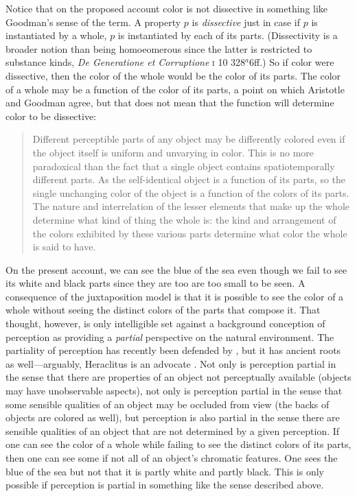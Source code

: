 Notice that on the proposed account color is not dissective in something like Goodman's \citeyearpar[53]{Goodman:1951ww} sense of the term. A property \( p \) is \emph{dissective} just in case if \( p \) is instantiated by a whole, \( p \) is instantiated by each of its parts. (Dissectivity is a broader notion than being homoeomerous since the latter is restricted to substance kinds, \emph{De Generatione et Corruptione} \textsc{i} 10 328\( ^{a} \)6ff.) So if color were dissective, then the color of the whole would be the color of its parts. The color of a whole may be a function of the color of its parts, a point on which Aristotle and Goodman agree, but that does not mean that the function will determine color to be dissective:
\begin{quote}
	Different perceptible parts of any object may be differently colored even if the object itself is uniform and unvarying in color. This is no more paradoxical than the fact that a single object contains spatiotemporally different parts. As the self-identical object is a function of its parts, so the single unchanging color of the object is a function of the colors of its parts. The nature and interrelation of the lesser elements that make up the whole determine what kind of thing the whole is: the kind and arrangement of the colors exhibited by these various parts determine what color the whole is said to have. \citep[130]{Goodman:1951ww}
\end{quote}

On the present account, we can see the blue of the sea even though we fail to see its white and black parts since they are too are too small to be seen. A consequence of the juxtaposition model is that it is possible to see the color of a whole without seeing the distinct colors of the parts that compose it. That thought, however, is only intelligible set against a background conception of perception as providing a \emph{partial} perspective on the natural environment. The partiality of perception has recently been defended by \citet{Hilbert:1987jq}, but it has ancient roots as well---arguably, Heraclitus is an advocate \citep[see][]{Burnyeat:1979mv,Kalderon:2006tg}. Not only is perception partial in the sense that there are properties of an object not perceptually available (objects may have unobservable aspects), not only is perception partial in the sense that some sensible qualities of an object may be occluded from view (the backs of objects are colored as well), but perception is also partial in the sense there are sensible qualities of an object that are not determined by a given perception. If one can see the color of a whole while failing to see the distinct colors of its parts, then one can see some if not all of an object's chromatic features. One sees the blue of the sea but not that it is partly white and partly black. This is only possible if perception is partial in something like the sense described above. 

